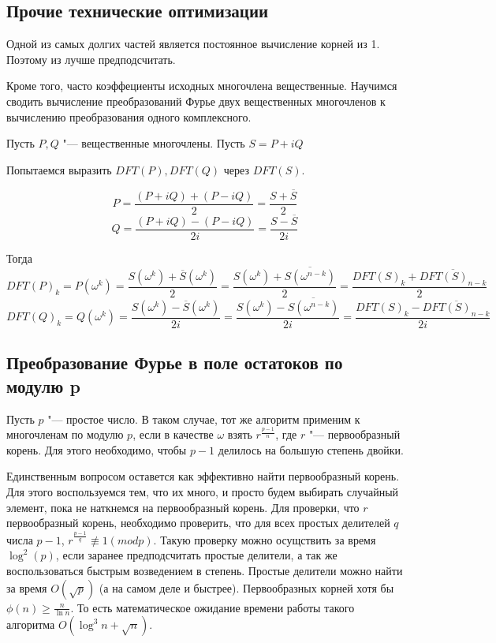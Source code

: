 \documentclass[12pt,a4paper]{article}
\theoremstyle{plain}
\begin{document}
\subsection{Прочие технические оптимизации}

Одной из самых долгих частей является постоянное вычисление корней из 1. Поэтому из лучше предподсчитать.

Кроме того, часто коэффециенты исходных многочлена вещественные. Научимся сводить вычисление преобразований
Фурье двух вещественных многочленов к вычислению преобразования одного комплексного.

Пусть $P, Q$ "--- вещественные многочлены. Пусть $S = P + iQ$

Попытаемся выразить $DFT(P), DFT(Q)$ через $DFT(S)$.

$$P = \frac{(P + i Q) + (P - i Q)}{2} = \frac{S + \overline{S}}{2}$$
$$Q = \frac{(P + i Q) - (P - i Q)}{2i} = \frac{S - \overline{S}}{2i}$$

Тогда $$DFT(P)_k = P(\omega^k) = \frac{S(\omega^k) + \overline{S}(\omega^k)}{2} = \frac{S(\omega^k) + \overline{S(\omega^{n-k})}}{2} = \frac{DFT(S)_k + \overline{DFT(S)_{n-k}}}{2}$$
$$DFT(Q)_k = Q(\omega^k) = \frac{S(\omega^k) - \overline{S}(\omega^k)}{2i} = \frac{S(\omega^k) - \overline{S(\omega^{n-k})}}{2i} = \frac{DFT(S)_k - \overline{DFT(S)_{n-k}}}{2i}$$

\subsection{Преобразование Фурье в поле остатоков по модулю p}

Пусть $p$ "--- простое число. В таком случае, тот же алгоритм применим к 
многочленам по модулю $p$, если в качестве $\omega$ взять $r^{\frac{p-1}{n}}$, где
$r$ "--- первообразный корень. Для этого необходимо, чтобы $p-1$ делилось на большую 
степень двойки.

Единственным вопросом оставется как эффективно найти первообразный корень.
Для этого воспользуемся тем, что их много, и просто будем выбирать случайный элемент,
пока не наткнемся на первообразный корень.
Для проверки, что $r$ первообразный корень, необходимо проверить, что для всех простых делителей $q$ 
числа $p-1$, $r^{\frac{p - 1}{q}} \not\equiv 1 (mod p)$. Такую проверку можно осущствить за время
$\log^2(p)$, если заранее предподсчитать простые делители, а так же воспользоваться быстрым возведением в степень.
Простые делители можно найти за время $O(\sqrt{p})$ (а на самом деле и быстрее).
Первообразных корней хотя бы $\phi(n) \ge \frac{n}{\ln{n}}$. То есть математическое ожидание времени работы такого алгоритма $O(\log^3{n} + \sqrt{n})$.
\end{document}
